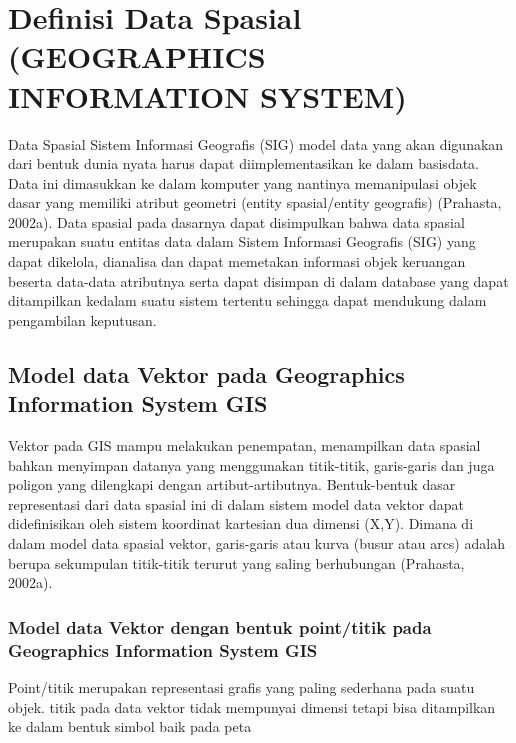 \section{Definisi Data Spasial (GEOGRAPHICS INFORMATION SYSTEM)}
Data Spasial Sistem Informasi Geografis (SIG) model data yang akan digunakan dari bentuk dunia nyata harus dapat diimplementasikan ke dalam basisdata. Data ini dimasukkan ke dalam komputer yang nantinya memanipulasi objek dasar yang memiliki atribut geometri (entity spasial/entity geografis) 
(Prahasta, 2002a). Data spasial pada dasarnya dapat disimpulkan bahwa data spasial merupakan suatu entitas data dalam Sistem Informasi Geografis (SIG) yang dapat dikelola, dianalisa dan dapat memetakan informasi objek keruangan beserta data-data atributnya serta dapat disimpan di dalam database yang dapat ditampilkan kedalam suatu sistem tertentu sehingga dapat mendukung dalam pengambilan keputusan. 

\subsection{Model data Vektor pada Geographics Information System GIS}
Vektor  pada GIS mampu melakukan penempatan, menampilkan data spasial bahkan menyimpan datanya yang menggunakan titik-titik, garis-garis dan juga poligon yang dilengkapi dengan artibut-artibutnya. Bentuk-bentuk dasar representasi dari data spasial ini di dalam sistem model data vektor dapat didefinisikan oleh sistem koordinat kartesian dua dimensi (X,Y). Dimana di dalam model data spasial vektor, garis-garis atau kurva (busur atau arcs) adalah berupa sekumpulan titik-titik terurut yang saling berhubungan (Prahasta, 2002a). 

\subsubsection{Model data Vektor dengan bentuk point/titik pada Geographics Information System GIS}
Point/titik merupakan representasi grafis yang paling sederhana pada suatu objek. titik pada data vektor tidak mempunyai dimensi tetapi bisa ditampilkan ke dalam bentuk simbol baik pada peta 
